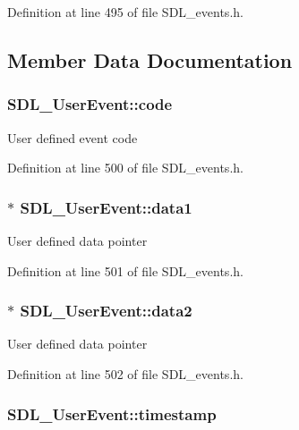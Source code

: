 Definition at line 495 of file S\-D\-L\-\_\-events.\-h.



\subsection{Member Data Documentation}
\hypertarget{struct_s_d_l___user_event_aef47976781ee82b527a353c5acfa0a34}{
\subsubsection[{code}]{ S\-D\-L\-\_\-\-User\-Event\-::code}}\label{struct_s_d_l___user_event_aef47976781ee82b527a353c5acfa0a34}
User defined event code 

Definition at line 500 of file S\-D\-L\-\_\-events.\-h.

\hypertarget{struct_s_d_l___user_event_ab2893a12be2f97195f16463a23107913}{
\subsubsection[{data1}]{$\ast$ S\-D\-L\-\_\-\-User\-Event\-::data1}}\label{struct_s_d_l___user_event_ab2893a12be2f97195f16463a23107913}
User defined data pointer 

Definition at line 501 of file S\-D\-L\-\_\-events.\-h.

\hypertarget{struct_s_d_l___user_event_aae4dbf65c34d654c9edf519eb061b7cf}{
\subsubsection[{data2}]{$\ast$ S\-D\-L\-\_\-\-User\-Event\-::data2}}\label{struct_s_d_l___user_event_aae4dbf65c34d654c9edf519eb061b7cf}
User defined data pointer 

Definition at line 502 of file S\-D\-L\-\_\-events.\-h.

\hypertarget{struct_s_d_l___user_event_adbf1d34c73138a0c549310e5d4ad0c35}{
\subsubsection[{timestamp}]{ S\-D\-L\-\_\-\-User\-Event\-::timestamp}}\label{struct_s_d_l___user_event_adbf1d34c73138a0c549310e5d4ad0c35}


